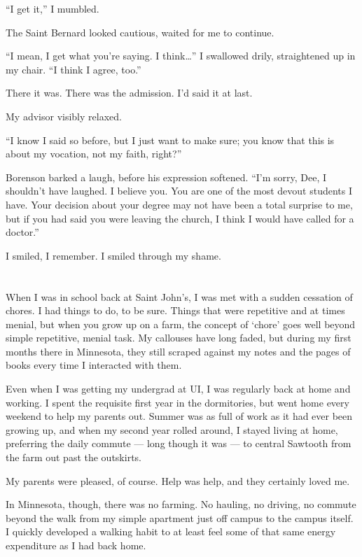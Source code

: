``I get it,'' I mumbled.

The Saint Bernard looked cautious, waited for me to continue.

``I mean, I get what you're saying. I think\ldots{}'' I swallowed drily, straightened up in my chair. ``I think I agree, too.''

There it was. There was the admission. I'd said it at last.

My advisor visibly relaxed.

``I know I said so before, but I just want to make sure; you know that this is about my vocation, not my faith, right?''

Borenson barked a laugh, before his expression softened. ``I'm sorry, Dee, I shouldn't have laughed. I believe you. You are one of the most devout students I have. Your decision about your degree may not have been a total surprise to me, but if you had said you were leaving the church, I think I would have called for a doctor.''

I smiled, I remember. I smiled through my shame.

\section{}

When I was in school back at Saint John's, I was met with a sudden cessation of chores. I had things to do, to be sure. Things that were repetitive and at times menial, but when you grow up on a farm, the concept of `chore' goes well beyond simple repetitive, menial task. My callouses have long faded, but during my first months there in Minnesota, they still scraped against my notes and the pages of books every time I interacted with them.

Even when I was getting my undergrad at UI, I was regularly back at home and working. I spent the requisite first year in the dormitories, but went home every weekend to help my parents out. Summer was as full of work as it had ever been growing up, and when my second year rolled around, I stayed living at home, preferring the daily commute --- long though it was --- to central Sawtooth from the farm out past the outskirts.

My parents were pleased, of course. Help was help, and they certainly loved me.

In Minnesota, though, there was no farming. No hauling, no driving, no commute beyond the walk from my simple apartment just off campus to the campus itself. I quickly developed a walking habit to at least feel some of that same energy expenditure as I had back home.

